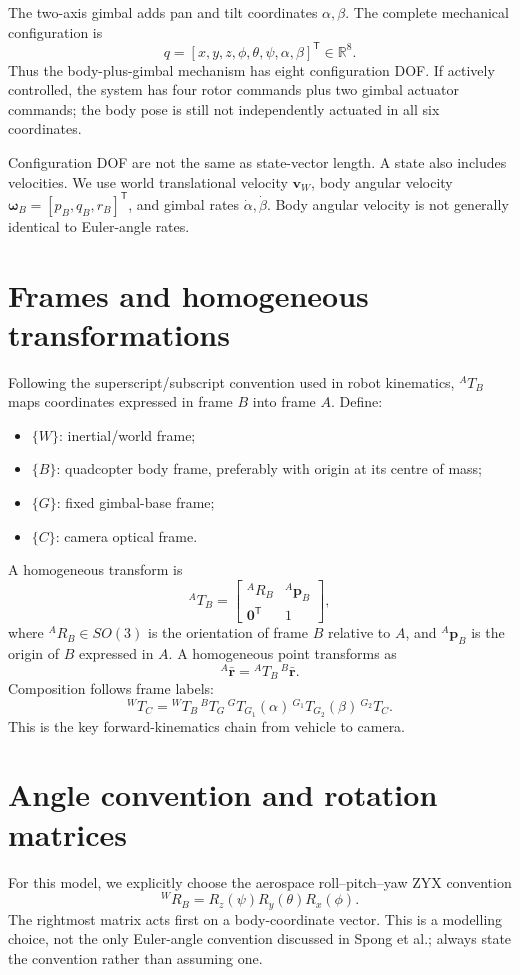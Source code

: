 \documentclass[11pt,a4paper]{article}
\begin{document}
The two-axis gimbal adds pan and tilt coordinates \(\alpha,\beta\). The complete mechanical configuration is
\[
q=[x,y,z,\phi,\theta,\psi,\alpha,\beta]^{\mathsf T}\in\mathbb R^8.
\]
Thus the body-plus-gimbal mechanism has eight configuration DOF. If actively controlled, the system has four rotor commands plus two gimbal actuator commands; the body pose is still not independently actuated in all six coordinates.

Configuration DOF are not the same as state-vector length. A state also includes velocities. We use world translational velocity \(\mathbf v_W\), body angular velocity \(\boldsymbol\omega_B=[p_B,q_B,r_B]^{\mathsf T}\), and gimbal rates \(\dot\alpha,\dot\beta\). Body angular velocity is not generally identical to Euler-angle rates.

\section{Frames and homogeneous transformations}
Following the superscript/subscript convention used in robot kinematics, \({}^{A}T_B\) maps coordinates expressed in frame \(B\) into frame \(A\). Define:
\begin{itemize}[leftmargin=1.4em]
\item \(\{W\}\): inertial/world frame;
\item \(\{B\}\): quadcopter body frame, preferably with origin at its centre of mass;
\item \(\{G\}\): fixed gimbal-base frame;
\item \(\{C\}\): camera optical frame.
\end{itemize}
A homogeneous transform is
\[
{}^{A}T_B=\begin{bmatrix}{}^{A}R_B&{}^{A}\mathbf p_B\\
\mathbf0^{\mathsf T}&1\end{bmatrix},
\]
where \({}^{A}R_B\in SO(3)\) is the orientation of frame \(B\) relative to \(A\), and \({}^{A}\mathbf p_B\) is the origin of \(B\) expressed in \(A\). A homogeneous point transforms as
\[
{}^{A}\bar{\mathbf r}={}^{A}T_B\,{}^{B}\bar{\mathbf r}.
\]
Composition follows frame labels:
\[
{}^{W}T_C={}^WT_B\,{}^BT_G\,{}^GT_{G_1}(\alpha)\,
{}^{G_1}T_{G_2}(\beta)\,{}^{G_2}T_C.
\]
This is the key forward-kinematics chain from vehicle to camera.

\section{Angle convention and rotation matrices}
\label{sec:angles}
For this model, we explicitly choose the aerospace roll--pitch--yaw ZYX convention
\[
{}^WR_B=R_z(\psi)R_y(\theta)R_x(\phi).
\]
The rightmost matrix acts first on a body-coordinate vector. This is a modelling choice, not the only Euler-angle convention discussed in Spong et al.; always state the convention rather than assuming one.
\end{document}
